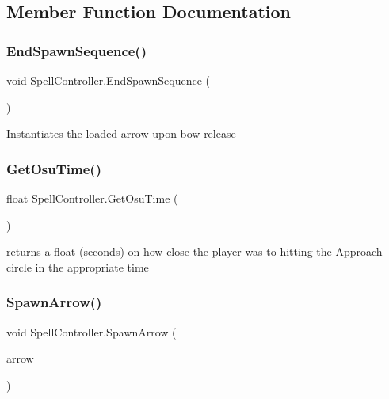 \subsection{Member Function Documentation}
\mbox{\label{class_spell_controller_a9b3f29e4230fcdf1b601c6a8d49574e0}} 
\subsubsection{\texorpdfstring{End\+Spawn\+Sequence()}{EndSpawnSequence()}}
{\footnotesize\ttfamily void Spell\+Controller.\+End\+Spawn\+Sequence (\begin{DoxyParamCaption}{ }\end{DoxyParamCaption})}

Instantiates the loaded arrow upon bow release \mbox{\label{class_spell_controller_ad6e891fc9dd19a3eccec2a05791abff4}} 
\subsubsection{\texorpdfstring{Get\+Osu\+Time()}{GetOsuTime()}}
{\footnotesize\ttfamily float Spell\+Controller.\+Get\+Osu\+Time (\begin{DoxyParamCaption}{ }\end{DoxyParamCaption})}

returns a float (seconds) on how close the player was to hitting the Approach circle in the appropriate time \mbox{\label{class_spell_controller_a779832e1b2aa56a36708f5fe7c7cc434}} 
\subsubsection{\texorpdfstring{Spawn\+Arrow()}{SpawnArrow()}}
{\footnotesize\ttfamily void Spell\+Controller.\+Spawn\+Arrow (\begin{DoxyParamCaption}\item[{Game\+Object}]{arrow }\end{DoxyParamCaption})}


